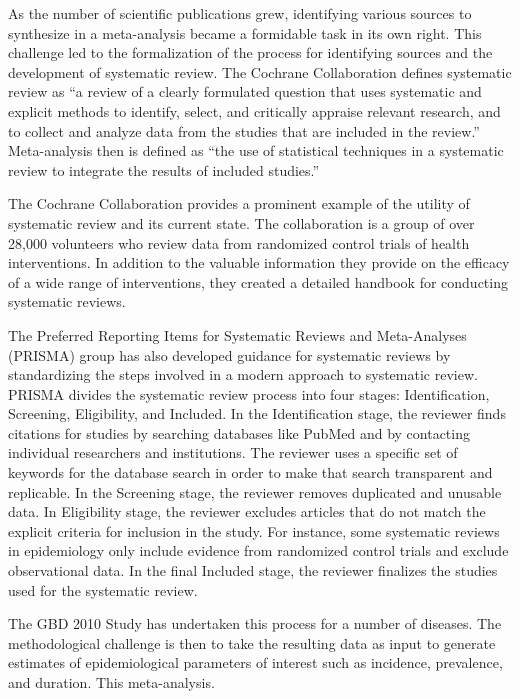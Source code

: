 As the number of scientific publications grew, identifying various
sources to synthesize in a meta-analysis became a formidable task in
its own right. This challenge led to the formalization of the process
for identifying sources and the development of systematic review. The
Cochrane Collaboration defines systematic review as ``a review of a
clearly formulated question that uses systematic and explicit methods
to identify, select, and critically appraise relevant research, and to
collect and analyze data from the studies that are included in the
review.'' Meta-analysis then is defined as ``the use of statistical
techniques in a systematic review to integrate the results of included
studies.'' \cite{Green_Systematic_2005}

The Cochrane Collaboration provides a prominent example of the utility
of systematic review and its current state. The collaboration is a
group of over 28,000 volunteers who review data from randomized
control trials of health interventions.
\cite{Cochrane_Cochrane_2012} In addition to the valuable information
they provide on the efficacy of a wide range of interventions, they
created a detailed handbook for conducting systematic
reviews.

The Preferred Reporting Items for Systematic Reviews and Meta-Analyses
(PRISMA) group has also developed guidance for systematic reviews by
standardizing the steps involved in a modern approach to systematic
review. \cite{Liberati_PRISMA_2009} PRISMA divides the systematic
review process into four stages: Identification, Screening,
Eligibility, and Included.  In the Identification stage, the reviewer
finds citations for studies by searching databases like PubMed and by
contacting individual researchers and institutions. The reviewer uses
a specific set of keywords for the database search in order to make
that search transparent and replicable. In the Screening stage, the
reviewer removes duplicated and unusable data. In Eligibility stage,
the reviewer excludes articles that do not match the explicit criteria
for inclusion in the study. For instance, some systematic reviews in
epidemiology only include evidence from randomized control trials and
exclude observational data. In the final Included stage, the reviewer
finalizes the studies used for the systematic review.

The GBD 2010 Study has undertaken this process for a
number of diseases. The methodological challenge is then to take the
resulting data as input to generate estimates of epidemiological
parameters of interest such as incidence, prevalence, and duration.
This meta-analysis.

